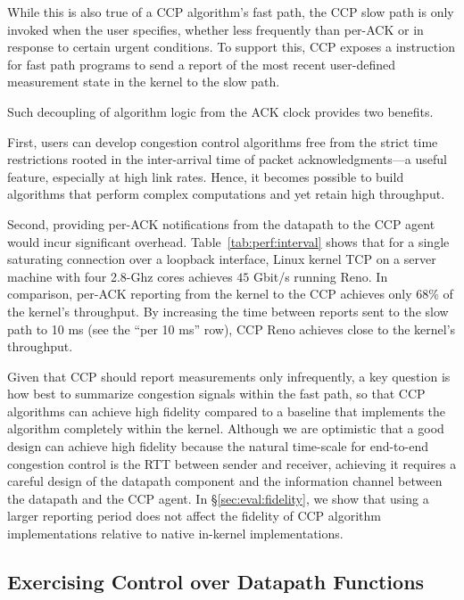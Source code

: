While this is also true of a CCP algorithm's fast path, the CCP slow path is
only invoked when the user specifies, whether less frequently than per-ACK or in response to certain urgent conditions.
%
To support this, CCP exposes a  instruction for fast path programs to send a
report of the most recent user-defined measurement state in the kernel to the slow path.
\fi

Such decoupling of algorithm logic from the ACK clock provides two benefits.

First, users can develop congestion control algorithms free from the strict
time restrictions rooted in the inter-arrival time of packet acknowledgments---a useful feature, especially at high link rates.
Hence, it becomes possible to build algorithms that perform complex computations and yet retain high throughput.

Second, providing per-ACK notifications from the datapath to the CCP agent would incur
significant overhead.
%
Table~\ref{tab:perf:interval} shows that for a single saturating 
connection over a loopback interface, Linux kernel TCP on a server machine
with four 2.8-Ghz cores achieves $45$ Gbit/s running Reno.
%
In comparison, per-ACK reporting from the kernel to the CCP \userspace achieves
only 68\% of the kernel's throughput.
%
By increasing the time between reports sent to the slow path to 10 ms (see the
``per 10 ms'' row), CCP Reno achieves close to the kernel's throughput.

Given that CCP should report measurements only infrequently, a key question is
how best to summarize congestion signals within the fast path, so that CCP
algorithms can achieve high fidelity compared to a baseline that implements the
algorithm completely within the kernel.
Although we are optimistic that a good design can achieve high fidelity because the natural time-scale for end-to-end
congestion control is the RTT between sender and receiver,
achieving it requires a careful design of the datapath component and the information channel between the datapath and the CCP agent.
In \S\ref{sec:eval:fidelity}, we show that using a
larger reporting period does not affect the fidelity of CCP algorithm
implementations relative to native in-kernel implementations.


\subsection{Exercising Control over Datapath Functions}
\label{sec:exercising-control-over-datapath}

